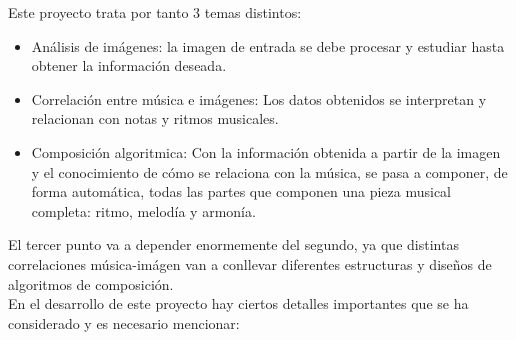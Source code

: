 		Este proyecto trata por tanto 3 temas distintos:
		
		\begin{itemize}
		
		\item Análisis de imágenes: la imagen de entrada se debe procesar y estudiar hasta obtener la información deseada.
		\item Correlación entre música e imágenes: Los datos obtenidos se interpretan y relacionan con notas y ritmos musicales.
		\item Composición algoritmica: Con la información obtenida a partir de la imagen y el conocimiento de cómo se relaciona con la música, se pasa a componer, de forma automática, todas las partes que componen una pieza musical completa: ritmo, melodía y armonía.
		\end{itemize}
		
		El tercer punto va a depender enormemente del segundo, ya que distintas correlaciones música-imágen van a conllevar diferentes estructuras y diseños de algoritmos de composición.\\
		
		En el desarrollo de este proyecto hay ciertos detalles importantes que se ha considerado y es necesario mencionar:	

